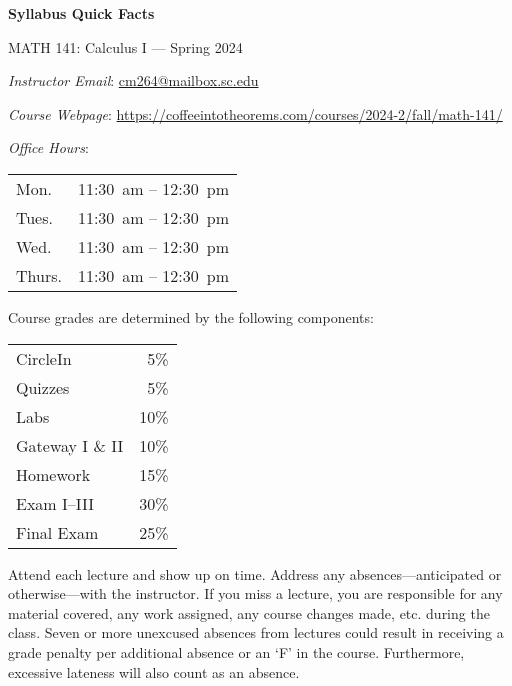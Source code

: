 \documentclass[11pt,letterpaper]{article}
\begin{document}
\begin{center} 
\bfseries
\color{stacred}
\LARGE Syllabus Quick Facts \par\vspace{0.2\baselineskip}
\Large MATH 141: Calculus I --- Spring 2024
\end{center} \pspace


\hspace{0.53cm} {\itshape Instructor Email}: \href{mailto:cm264@mailbox.sc.edu}{cm264@mailbox.sc.edu} \par
\hspace{0.53cm} {\itshape Course Webpage}: \href{https://coffeeintotheorems.com/courses/2024-2/fall/math-141/}{https://coffeeintotheorems.com/courses/2024-2/fall/math-141/} \par
\hspace{0.53cm} {\itshape Office Hours}: 	\par \vspace{-0.3cm}
	\begin{table}[!ht]
	\centering
	\begin{tabular}{l || l}
	Mon. & 11:30~am -- 12:30~pm \\
	Tues. & 11:30~am -- 12:30~pm \\
	Wed. & 11:30~am -- 12:30~pm \\
	Thurs. & 11:30~am -- 12:30~pm
	\end{tabular}
	\end{table}


Course grades are determined by the following components: \par \vspace{-0.3cm}
	\begin{table}[!ht]
        \begin{tabular}{lr}
	CircleIn & 5\% \\
	Quizzes & 5\% \\
	Labs & 10\% \\
	Gateway I \& II & 10\% \\
	Homework & 15\% \\
	Exam I--III & 30\% \\
	Final Exam & 25\%
        \end{tabular} 
        \end{table}


Attend each lecture and show up on time. Address any absences---anticipated or otherwise---with the instructor. If you miss a lecture, you are responsible for any material covered, any work assigned, any course changes made, etc. during the class. Seven or more unexcused absences from lectures could result in receiving a grade penalty per additional absence or an `F' in the course. Furthermore, excessive lateness will also count as an absence. 
\pspace
\end{document}
